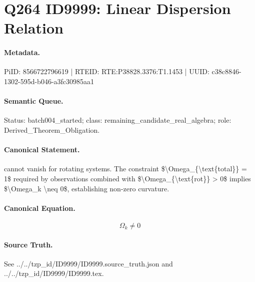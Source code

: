 \section*{Q264 ID9999: Linear Dispersion Relation}
\paragraph{Metadata.}
PiID: 8566722796619 | RTEID: RTE:P38828.3376:T1.1453 | UUID: c38c8846-1302-595d-b046-a3fc30985aa1

\paragraph{Semantic Queue.}
Status: batch004\_started; class: remaining\_candidate\_real\_algebra; role: Derived\_Theorem\_Obligation.

\paragraph{Canonical Statement.}
cannot vanish for rotating systems. The constraint \$\textbackslash{}Omega\_\{\textbackslash{}text\{total\}\} = 1\$ required by observations combined with \$\textbackslash{}Omega\_\{\textbackslash{}text\{rot\}\} > 0\$ implies \$\textbackslash{}Omega\_k \textbackslash{}neq 0\$, establishing non-zero curvature.

\paragraph{Canonical Equation.}
\[
\Omega_k \neq 0
\]

\paragraph{Source Truth.}
See ../../tzp\_id/ID9999/ID9999.source\_truth.json and ../../tzp\_id/ID9999/ID9999.tex.
